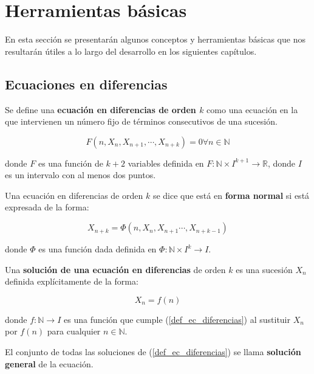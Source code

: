 
\chapter{Herramientas básicas}

En esta sección se presentarán algunos conceptos y herramientas básicas que nos resultarán útiles a lo largo del desarrollo en los siguientes capítulos.

\section{Ecuaciones en diferencias}

\begin{definition}
Se define una \textbf{ecuación en diferencias de orden $k$} como una ecuación en la que intervienen un número fijo de términos consecutivos de una sucesión.

\begin{equation}
\label{def_ec_diferencias}
F(n,X_n, X_{n+1}, \cdots , X_{n+k}) = 0 \forall n\in\mathbb{N}
\end{equation}


donde $F$ es una función de $k+2$ variables definida en $F:\mathbb{N}\times I^{k+1}\rightarrow \mathbb{R}$, donde $I$ es un intervalo con al menos dos puntos.
\end{definition}

\begin{definition}
Una ecuación en diferencias de orden $k$ se dice que está en \textbf{forma normal} si está expresada de la forma:

\begin{equation}
\label{def_ec_forma_normal}
X_{n+k} = \Phi (n, X_n, X_{n+1}\cdots , X_{n+k-1})
\end{equation}


donde $\Phi$ es una función dada definida en $\Phi :\mathbb{N}\times I^{k}\rightarrow I$.
\end{definition}

\begin{definition}
Una \textbf{solución de una ecuación en diferencias} de orden $k$ es una sucesión $X_n$ definida explícitamente de la forma:

$$X_n = f(n)$$

donde $f: \mathbb{N} \rightarrow I$ es una función que cumple (\ref{def_ec_diferencias}) al sustituir $X_n$ por $f(n)$ para cualquier $n\in\mathbb{N}$.

El conjunto de todas las soluciones de (\ref{def_ec_diferencias}) se llama \textbf{solución general} de la ecuación.
\end{definition}

